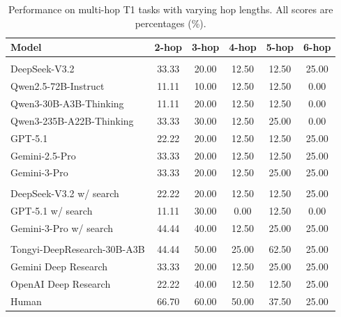 \begin{table}[t]
\centering
\caption{Performance on multi-hop T1 tasks with varying hop lengths.
All scores are percentages (\%).}
\small
\setlength{\tabcolsep}{6pt}

\begin{tabular}{l ccccc}
\toprule
\textbf{Model} &
\textbf{2-hop} & \textbf{3-hop} & \textbf{4-hop} &
\textbf{5-hop} & \textbf{6-hop} \\
\midrule

\rowcolor{gray!15}
\multicolumn{6}{l}{\textit{LLMs}} \\

DeepSeek-V3.2
& 33.33 & 20.00 & 12.50 & 12.50 & 25.00 \\

Qwen2.5-72B-Instruct
& 11.11 & 10.00 & 12.50 & 12.50 & 0.00 \\

Qwen3-30B-A3B-Thinking
& 11.11 & 20.00 & 12.50 & 12.50 & 0.00 \\

Qwen3-235B-A22B-Thinking
& 33.33 & 30.00 & 12.50 & 25.00 & 0.00 \\

GPT-5.1
& 22.22 & 20.00 & 12.50 & 12.50 & 25.00 \\

Gemini-2.5-Pro
& 33.33 & 20.00 & 12.50 & 12.50 & 25.00 \\

Gemini-3-Pro
& 33.33 & 20.00 & 12.50 & 25.00 & 25.00 \\

\midrule
\rowcolor{gray!15}
\multicolumn{6}{l}{\textit{LLMs with Search Tools}} \\

DeepSeek-V3.2 w/ search
& 22.22 & 20.00 & 12.50 & 12.50 & 25.00 \\

GPT-5.1 w/ search
& 11.11 & 30.00 & 0.00 & 12.50 & 0.00 \\

Gemini-3-Pro w/ search
& 44.44 & 40.00 & 12.50 & 25.00 & 25.00 \\

\midrule
\rowcolor{gray!15}
\multicolumn{6}{l}{\textit{Deep Research Agents}} \\

Tongyi-DeepResearch-30B-A3B
& 44.44 & 50.00 & 25.00 & 62.50 & 25.00 \\

Gemini Deep Research
& 33.33 & 20.00 & 12.50 & 25.00 & 25.00 \\

OpenAI Deep Research
& 22.22 & 40.00 & 12.50 & 12.50 & 25.00 \\

\midrule
Human
& 66.70 & 60.00 & 50.00 & 37.50 & 25.00 \\

\bottomrule
\end{tabular}
\label{tab:t1-hop-results}
\end{table}


